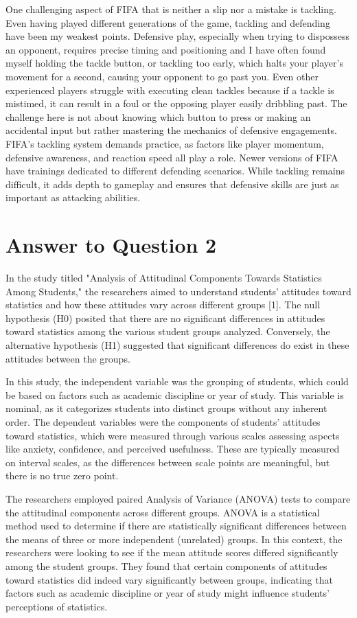 \documentclass[
	letterpaper, %
]{jdf}
\begin{document}
One challenging aspect of FIFA that is neither a slip nor a mistake is tackling. Even having played different generations of the game, tackling and defending have been my weakest points. Defensive play, especially when trying to dispossess an opponent, requires precise timing and positioning and I have often found myself holding the tackle button, or tackling too early, which halts your player's movement for a second, causing your opponent to go past you. Even other experienced players struggle with executing clean tackles because if a tackle is mistimed, it can result in a foul or the opposing player easily dribbling past. The challenge here is not about knowing which button to press or making an accidental input but rather mastering the mechanics of defensive engagements. FIFA’s tackling system demands practice, as factors like player momentum, defensive awareness, and reaction speed all play a role. Newer versions of FIFA have trainings dedicated to different defending scenarios. While tackling remains difficult, it adds depth to gameplay and ensures that defensive skills are just as important as attacking abilities.
\newpage

\section{Answer to Question 2}
In the study titled "Analysis of Attitudinal Components Towards Statistics Among Students," the researchers aimed to understand students' attitudes toward statistics and how these attitudes vary across different groups [1]. The null hypothesis (H0) posited that there are no significant differences in attitudes toward statistics among the various student groups analyzed. Conversely, the alternative hypothesis (H1) suggested that significant differences do exist in these attitudes between the groups.

In this study, the independent variable was the grouping of students, which could be based on factors such as academic discipline or year of study. This variable is nominal, as it categorizes students into distinct groups without any inherent order. The dependent variables were the components of students' attitudes toward statistics, which were measured through various scales assessing aspects like anxiety, confidence, and perceived usefulness. These are typically measured on interval scales, as the differences between scale points are meaningful, but there is no true zero point.

The researchers employed paired Analysis of Variance (ANOVA) tests to compare the attitudinal components across different groups. ANOVA is a statistical method used to determine if there are statistically significant differences between the means of three or more independent (unrelated) groups. In this context, the researchers were looking to see if the mean attitude scores differed significantly among the student groups. They found that certain components of attitudes toward statistics did indeed vary significantly between groups, indicating that factors such as academic discipline or year of study might influence students' perceptions of statistics.
\end{document}
